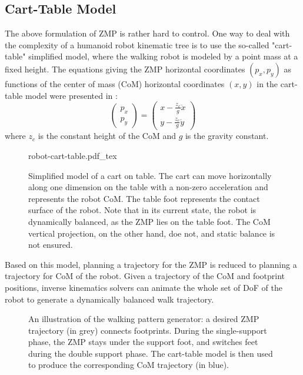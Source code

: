 \subsection{Cart-Table Model}
\label{subsec:chap1-cart-table}

The above formulation of ZMP is rather hard to control.  One way to
deal with the complexity of a humanoid robot kinematic tree is to use
the so-called "cart-table" simplified model, where the walking robot
is modeled by a point mass at a fixed height.  The equations giving
the ZMP horizontal coordinates $(p_x,p_y)$ as functions of the center
of mass (CoM) horizontal coordinates $(x,y)$ in the cart-table model
were presented in \cite{kaji03}:
\begin{equation}
\label{eq:chap1-walk-zmp}
\left(
\begin{array}{c}
p_x\\ p_y
\end{array}
\right) = \displaystyle \left(
\begin{array}{c}
x - \frac{z_c}{g} \ddot{x}\\ y - \frac{z_c}{g} \ddot{y}
\end{array}
\right)
\end{equation}
where $z_c$ is the constant height of the CoM and $g$ is the gravity
constant.

\begin{figure}
  \centering
      {\def\svgwidth{0.5\linewidth}
        
                   {robot-cart-table.pdf_tex}}
      \caption{Simplified model of a cart on table. The cart can move
        horizontally along one dimension on the table with a non-zero
        acceleration and represents the robot CoM. The table foot
        represents the contact surface of the robot. Note that in its
        current state, the robot is dynamically balanced, as the ZMP
        lies on the table foot. The CoM vertical projection, on the
        other hand, doe not, and static balance is not ensured.}
      \label{fig:chap1-robot-cart-table}
\end{figure}

Based on this model, planning a trajectory for the ZMP is reduced to
planning a trajectory for CoM of the robot. Given a trajectory of the
CoM and footprint positions, inverse kinematics solvers can animate
the whole set of DoF of the robot to generate a dynamically balanced
walk trajectory.

\begin{figure}
  \centering
  
  \caption{An illustration of the walking pattern generator: a desired
    ZMP trajectory (in grey) connects footprints. During the
    single-support phase, the ZMP stays under the support foot, and
    switches feet during the double support phase. The cart-table
    model is then used to produce the corresponding CoM trajectory (in
    blue).}
  \label{fig:chap1-zmp}
\end{figure}

